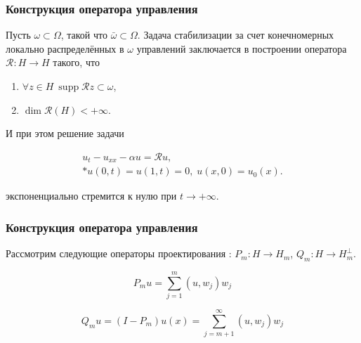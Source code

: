 \documentclass{beamer}
\newcommand{\operator}[1]{\mathcal{R}{#1}}
\newcommand{\supp}{\mathop{\mathrm{supp}}}
\begin{document}
\begin{frame}
\frametitle{Конструкция оператора управления}

\hspace{5mm}Пусть $\omega \subset \Omega$, такой что $\bar{\omega} \subset
\Omega$. Задача стабилизации за счет конечномерных локально распределённых в 
$\omega$ управлений заключается в построении оператора 
$\mathcal{R} : H \rightarrow H$ такого, что
\begin{enumerate}
\item $\forall z \in H \ \supp \operator{z} \subset \omega$,
\item $\dim \operator{(H)} < +\infty$.
\end{enumerate}
И при этом решение задачи 
\begin{block}{}
\begin{gather}
  u_t - u_{xx} - \alpha u = \mathcal{R}u, \\*
  u(0, t) = u(1, t) = 0, \; u(x, 0) = u_{0}(x).
\end{gather}
\end{block}
экспоненциально стремится к нулю при $t \rightarrow + \infty$.
\end{frame}


\begin{frame}
\frametitle{Конструкция оператора управления}

Рассмотрим следующие операторы проектирования : 
$P_m : H \rightarrow H_m$, $Q_m : H \rightarrow H_m^{\perp}$.

\begin{block}{}
\begin{equation}
	P_m u = \sum \limits_{j=1}^{m} {(u, w_j) w_j}
\end{equation}

\begin{equation}
	Q_m u = (I - P_m)u(x) = \sum \limits_{j=m + 1}^{\infty} {(u, w_j) w_j}
\end{equation}
\end{block}

\end{frame}
\end{document}

